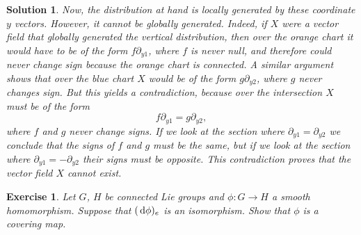 \documentclass{article}
\newtheorem{ex}{Exercise}
\theoremstyle{nonumberplain}
\newtheorem{sol}{Solution}
\begin{document}
\begin{sol}
Now, the distribution at hand is locally generated by these coordinate $y$ vectors. However, it cannot be globally generated. Indeed, if $X$ were a vector field that globally generated the vertical distribution, then over the orange chart it would have to be of the form $f \partial_{y1}$, where $f$ is never null, and therefore could never change sign because the orange chart is connected. A similar argument shows that over the blue chart $X$ would be of the form $g \partial_{y2}$, where $g$ never changes sign. But this yields a contradiction, because over the intersection $X$ must be of the form
\[f \partial_{y1} = g \partial_{y2},\]
where $f$ and $g$ never change signs. If we look at the section where $\partial_{y1} = \partial_{y2}$ we conclude that the signs of $f$ and $g$ must be the same, but if we look at the section where $\partial_{y1} = - \partial_{y2}$ their signs must be opposite. This contradiction proves that the vector field $X$ cannot exist.
\end{sol}

\begin{ex}
Let $G$, $H$ be connected Lie groups and $\phi \colon G \to H$ a smooth homomorphism. Suppose that $(\dl \phi)_e$ is an isomorphism. Show that $\phi$ is a covering map.
\end{ex}
\end{document}
